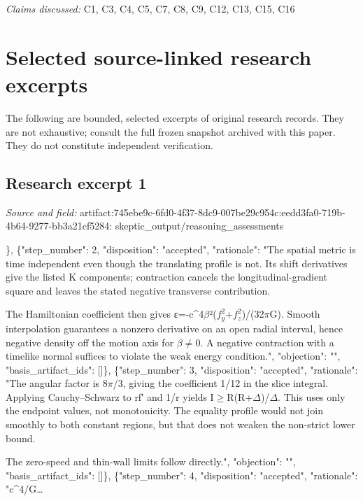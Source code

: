 \documentclass[11pt]{article}
\begin{document}
\textit{Claims discussed: }C1, C3, C4, C5, C7, C8, C9, C12, C13, C15, C16
\appendix
\section{Selected source-linked research excerpts}
The following are bounded, selected excerpts of original research records. They are not exhaustive; consult the full frozen snapshot archived with this paper. They do not constitute independent verification.
\subsection{Research excerpt 1}
\textit{Source and field: }artifact:745ebe9c-6fd0-4f37-8dc9-007be29c954c:eedd3fa0-719b-4b64-9277-bb3a21cf5284: skeptic\_output/reasoning\_assessments\par
[\{"step\_number": 1, "disposition": "accepted", "rationale": "Accepted as the explicit premises of the conditional claim, not as an established physical realization. Substitution gives g(n,n)=-1, and the lapse, shift, and Euclidean spatial metric follow from the line element. The primary-source citation is expressly identified as uninspected rather than used as proof.", "objection": "", "basis\_artifact\_ids": []\}, \{"step\_number": 2, "disposition": "accepted", "rationale": "The spatial metric is time independent even though the translating profile is not. Its shift derivatives give the listed K components; contraction cancels the longitudinal-gradient square and leaves the stated negative transverse contribution.

The Hamiltonian coefficient then gives ε=-c\textasciicircum{}4$\beta$²($f_y^{2}$+$f_z^{2}$)/(32$\pi$G). Smooth interpolation guarantees a nonzero derivative on an open radial interval, hence negative density off the motion axis for $\beta$$\neq$0. A negative contraction with a timelike normal suffices to violate the weak energy condition.", "objection": "", "basis\_artifact\_ids": []\}, \{"step\_number": 3, "disposition": "accepted", "rationale": "The angular factor is 8$\pi$/3, giving the coefficient 1/12 in the slice integral. Applying Cauchy–Schwarz to rf′ and 1/r yields I$\geq$R(R+$\Delta$)/$\Delta$. This uses only the endpoint values, not monotonicity. The equality profile would not join smoothly to both constant regions, but that does not weaken the non-strict lower bound.

The zero-speed and thin-wall limits follow directly.", "objection": "", "basis\_artifact\_ids": []\}, \{"step\_number": 4, "disposition": "accepted", "rationale": "c\textasciicircum{}4/G…
\end{document}
